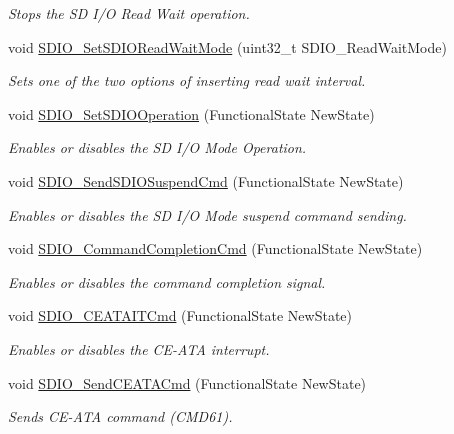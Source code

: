 \begin{DoxyCompactItemize}
\begin{DoxyCompactList}\small\item\em Stops the S\-D I/\-O Read Wait operation. \end{DoxyCompactList}\item 
void \hyperlink{group___s_d_i_o_ga2baac4ea1bb6c2d94345d2712604338a}{S\-D\-I\-O\-\_\-\-Set\-S\-D\-I\-O\-Read\-Wait\-Mode} (uint32\-\_\-t S\-D\-I\-O\-\_\-\-Read\-Wait\-Mode)
\begin{DoxyCompactList}\small\item\em Sets one of the two options of inserting read wait interval. \end{DoxyCompactList}\item 
void \hyperlink{group___s_d_i_o_ga24e210c185d5a7855cbaff4472a8f8d1}{S\-D\-I\-O\-\_\-\-Set\-S\-D\-I\-O\-Operation} (Functional\-State New\-State)
\begin{DoxyCompactList}\small\item\em Enables or disables the S\-D I/\-O Mode Operation. \end{DoxyCompactList}\item 
void \hyperlink{group___s_d_i_o_ga9264137a01a1ab81d03bc80a3b3120fc}{S\-D\-I\-O\-\_\-\-Send\-S\-D\-I\-O\-Suspend\-Cmd} (Functional\-State New\-State)
\begin{DoxyCompactList}\small\item\em Enables or disables the S\-D I/\-O Mode suspend command sending. \end{DoxyCompactList}\item 
void \hyperlink{group___s_d_i_o_ga1bbe98c629812bc62121d9c8b2c5e21b}{S\-D\-I\-O\-\_\-\-Command\-Completion\-Cmd} (Functional\-State New\-State)
\begin{DoxyCompactList}\small\item\em Enables or disables the command completion signal. \end{DoxyCompactList}\item 
void \hyperlink{group___s_d_i_o_gab44b8cbc21be000a291563076159503b}{S\-D\-I\-O\-\_\-\-C\-E\-A\-T\-A\-I\-T\-Cmd} (Functional\-State New\-State)
\begin{DoxyCompactList}\small\item\em Enables or disables the C\-E-\/\-A\-T\-A interrupt. \end{DoxyCompactList}\item 
void \hyperlink{group___s_d_i_o_ga8dc7f17804bdb745b42f6647c8487b4c}{S\-D\-I\-O\-\_\-\-Send\-C\-E\-A\-T\-A\-Cmd} (Functional\-State New\-State)
\begin{DoxyCompactList}\small\item\em Sends C\-E-\/\-A\-T\-A command (C\-M\-D61). \end{DoxyCompactList}\item 

\end{DoxyCompactItemize}
